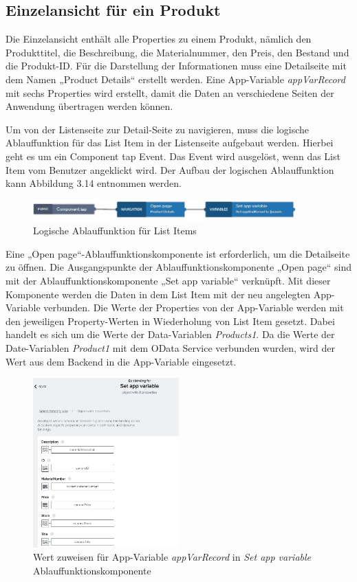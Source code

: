 \subsection{Einzelansicht für ein Produkt}
Die Einzelansicht enthält alle Properties zu einem Produkt, nämlich den Produkttitel, die Beschreibung, die Materialnummer, den Preis, den Bestand und die Produkt-ID. Für die Darstellung der Informationen muss eine Detailseite mit dem Namen „Product Details“ erstellt werden. Eine App-Variable \textit{appVarRecord} mit sechs Properties wird erstellt, damit die Daten an verschiedene Seiten der Anwendung übertragen werden können.

Um von der Listenseite zur Detail-Seite zu navigieren, muss die logische Ablauffunktion für das List Item in der Listenseite aufgebaut werden. Hierbei geht es um ein Component tap Event. Das Event wird ausgelöst, wenn das List Item vom Benutzer angeklickt wird. Der Aufbau der logischen Ablauffunktion kann Abbildung 3.14 entnommen werden. 
\begin{figure}[htbp]
 \centering
 \includegraphics[width=0.9\textwidth]{Bilder/appgyver/3_14_Logik_ListItem.JPG}
 \caption{Logische Ablauffunktion für List Items}
\end{figure}

Eine „Open page“-Ablauffunktionskomponente ist erforderlich, um die Detailseite zu öffnen. Die Ausgangspunkte der Ablauffunktionskomponente „Open page“ sind mit der Ablauffunktionskomponente „Set app variable“ verknüpft. Mit dieser Komponente werden die Daten in dem List Item mit der neu angelegten App-Variable verbunden. Die Werte der Properties von der App-Variable werden mit den jeweiligen Property-Werten in Wiederholung von List Item gesetzt. Dabei handelt es sich um die Werte der Data-Variablen \textit{Products1}. Da die Werte der Date-Variablen \textit{Product1} mit dem OData Service verbunden wurden, wird der Wert aus dem Backend in die App-Variable eingesetzt.

\begin{figure}[htbp]
 \centering
 \includegraphics[width=0.5\textwidth]{Bilder/appgyver/3_15_set_app_variable.JPG}
 \caption{Wert zuweisen für App-Variable \textit{appVarRecord} in \textit{Set app variable} Ablauffunktionskomponente}
\end{figure}

